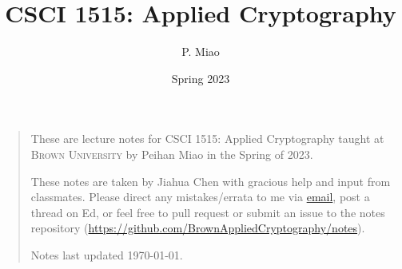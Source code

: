 \documentclass[letterpaper, 11pt, colorful, sections]{cs1515}
\title{CSCI 1515: Applied Cryptography}
\author{P. Miao}
\date{Spring 2023}
\numberwithin{equation}{section}
\begin{document}
\maketitle
\begin{quote}
    \quad These are lecture notes for CSCI 1515: Applied Cryptography taught at \textsc{Brown University} by Peihan Miao in the Spring of 2023.

    \quad These notes are taken by Jiahua Chen with gracious help and input from classmates. Please direct any mistakes/errata to me via \href{mailto:jiahua_chen2@brown.edu}{email}, post a thread on Ed, or feel free to pull request or submit an issue to the notes repository (\url{https://github.com/BrownAppliedCryptography/notes}).

    \quad Notes last updated \today.
\end{quote}
\tableofcontents
% 
% 

\newpage



\end{document}
